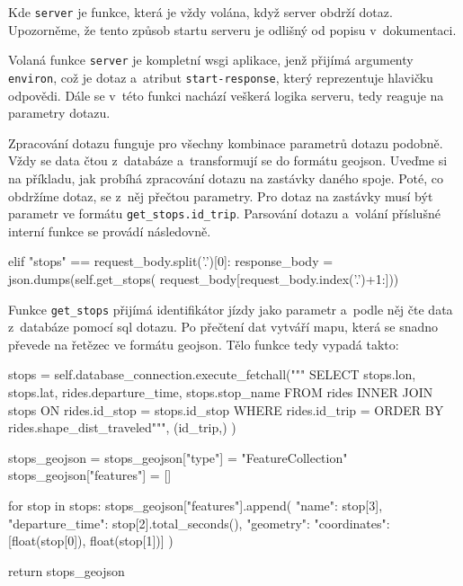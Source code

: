 Kde \verb-server- je funkce, která je vždy volána, když server obdrží dotaz. Upozorněme, že tento způsob startu serveru je odlišný od popisu v~dokumentaci.


\bigbreak


Volaná funkce \verb-server- je kompletní \gls{wsgi} aplikace, jenž přijímá argumenty \verb-environ-, což je dotaz a~atribut \verb:start-response:, který reprezentuje hlavičku odpovědi. Dále se v~této funkci nachází veškerá logika serveru, tedy reaguje na parametry dotazu.


\bigbreak


Zpracování dotazu funguje pro všechny kombinace parametrů dotazu podobně. Vždy se data čtou z~databáze a~transformují se do formátu \gls{geojson}. Uveďme si na příkladu, jak probíhá zpracování dotazu na zastávky daného spoje. Poté, co obdržíme dotaz, se z~něj přečtou parametry. Pro dotaz na zastávky musí být parametr ve formátu \verb-get_stops.id_trip-. Parsování dotazu a~volání příslušné interní funkce se provádí následovně.


\begin{code}[frame=none]
elif "stops" == request_body.split('.')[0]:
  response_body = json.dumps(self.get_stops(
    request_body[request_body.index('.')+1:]))
\end{code}


Funkce \verb-get_stops- přijímá identifikátor jízdy jako parametr a~podle něj čte data z~databáze pomocí \gls{sql} dotazu. Po přečtení dat vytváří mapu, která se snadno převede na řetězec ve formátu \gls{geojson}. Tělo funkce tedy vypadá takto:


\begin{code}[frame=none]
stops = self.database_connection.execute_fetchall("""
SELECT
  stops.lon,
  stops.lat,
  rides.departure_time,
  stops.stop_name
FROM rides
INNER JOIN stops ON rides.id_stop = stops.id_stop
WHERE rides.id_trip = %
ORDER BY rides.shape_dist_traveled""",
(id_trip,)
)


stops_geojson = {}
stops_geojson["type"] = "FeatureCollection"
stops_geojson["features"] = []


for stop in stops:
stops_geojson["features"].append({
  "name": stop[3],
  "departure_time": stop[2].total_seconds(),
  "geometry": {
    "coordinates": [float(stop[0]), float(stop[1])]
  }
})


return stops_geojson
\end{code}






































